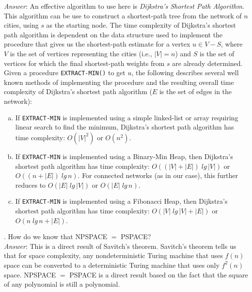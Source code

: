 \documentclass{scrartcl}
\begin{document}
    \noindent
    \textit{Answer}: An effective algorithm to use here is \emph{Dijkstra's Shortest Path
    Algorithm}. This algorithm can be use to construct a shortest-path tree from the network of $n$
    cities, using $s$ as the starting node. The time complexity of Dijkstra's shortest path
    algorithm is dependent on the data structure used to implement the procedure that gives us the
    shortest-path estimate for a vertex $u \in V - S$, where $V$ is the set of vertices representing
    the cities (i.e., $|V| = n$) and $S$ is the set of vertices for which the final shortest-path
    weights from $s$ are already determined. Given a procedure \verb|EXTRACT-MIN()| to get $u$, the
    following describes several well known methods of implementing the procedure and the resulting
    overall time complexity of Dijkstra's shortest path algorithm ($E$ is the set of edges in the
    network):\\
    \begin{enumerate}[(a)]
        \item If \verb|EXTRACT-MIN| is implemented using a simple linked-list or array requiring
            linear search to find the minimum, Dijkstra's shortest path algorithm has time
            complexity: $O(|V|^2)$ or $O(n^2)$.\\
        \item If \verb|EXTRACT-MIN| is implemented using a Binary-Min Heap, then Dijkstra's shortest
            path algorithm has time complexity: $O((|V| + |E|)\;lg\,|V|)$ or $O((n + |E|)\;lg\,n)$.
            For connected networks (as in our case), this further reduces to $O(|E|\;lg\,|V|)$ or
            $O(|E|\;lg\,n)$.\\
        \item If \verb|EXTRACT-MIN| is implemented using a Fibonacci Heap, then Dijkstra's shortest
            path algorithm has time complexity: $O(|V|\;lg\,|V| + |E|)$ or $O(n\;lg\,n + |E|)$.\\
    \end{enumerate}

    \bigskip
    . How do we know that \textsf{NPSPACE $=$ PSPACE}?\\

    \noindent
    \textit{Answer}: This is a direct result of Savitch's theorem. Savitch's theorem tells us that
    for space complexity, any nondeterministic Turing machine that uses $f(n)$ space can be
    converted to a deterministic Turing machine that uses only $f^2(n)$ space. \textsf{NPSPACE $=$
    PSPACE} is a direct result based on the fact that the square of any polynomial is still a
    polynomial.\\
\end{document}
